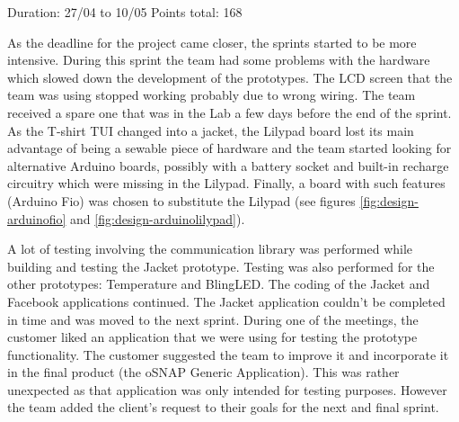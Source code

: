Duration: 27/04 to 10/05\newline
Points total: 168

As the deadline for the project came closer, the sprints started to be
more intensive. During this sprint the team had some problems with the hardware
which slowed down the development of the prototypes. The LCD screen that the team
was using stopped working probably due to wrong wiring. The team received a
spare one that was in the Lab a few days before the end of the sprint. As the
T-shirt TUI changed into a jacket, the Lilypad board lost its main advantage
of being a sewable piece of hardware and the team started looking for alternative
Arduino boards, possibly with a battery socket and built-in recharge circuitry
which were missing in the Lilypad. Finally, a board with such features
(Arduino Fio) was chosen to substitute the Lilypad (see figures  \ref{fig:design-arduinofio} and  \ref{fig:design-arduinolilypad}).

A lot of testing involving the communication library was performed while building and testing the Jacket prototype.
Testing was also performed for the other prototypes: Temperature and BlingLED.
The coding of the Jacket and Facebook applications continued.
The Jacket application couldn't be completed in time and was moved to the next
sprint. During one of the meetings, the customer liked an application that we
were using for testing the prototype functionality. The customer suggested the team to 
improve it and incorporate it in the final product (the oSNAP Generic Application). This was rather 
unexpected as that  application was only intended for testing purposes. However the team 
added the client's  request to their goals for the next and final sprint.


